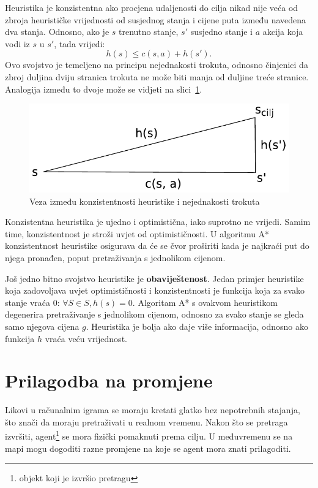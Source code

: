 \documentclass[times, utf8, zavrsni, numeric]{fer}
\begin{document}
\par Heuristika je konzistentna ako procjena udaljenosti do cilja nikad nije veća od zbroja heurističke vrijednosti od susjednog stanja i cijene puta između navedena dva stanja.
Odnosno, ako je \(s\) trenutno stanje, \(s'\) susjedno stanje i \(a\) akcija koja vodi iz \(s\) u \(s'\), tada vrijedi:
\begin{equation}
h(s) \leq c(s, a) + h(s').
\end{equation} 
Ovo svojstvo je temeljeno na principu nejednakosti trokuta, odnosno činjenici da zbroj duljina dviju stranica trokuta ne može biti manja od duljine treće stranice.
Analogija između to dvoje može se vidjeti na slici~\ref{fig:triangleInequality}.

\begin{figure}[h]
	\centering
	\includegraphics[width=0.5\linewidth]{images/triangleInequality.pdf}
	\caption{Veza između konzistentnosti heuristike i nejednakosti trokuta}
	\label{fig:triangleInequality}
\end{figure} 

\par Konzistentna heuristika je ujedno i optimistična, iako suprotno ne vrijedi. 
Samim time, konzistentnost je stroži uvjet od optimističnosti. 
U algoritmu A* konzistentnost heuristike osigurava da će se čvor proširiti kada je najkraći put do njega pronađen, poput pretraživanja s jednolikom cijenom.

\par Još jedno bitno svojstvo heuristike je \textbf{obaviještenost}. 
Jedan primjer heuristike koja zadovoljava uvjet optimističnosti i konzistentnosti je funkcija koja za svako stanje vraća 0: \(\forall S \in S, h(s) = 0\). 
Algoritam A* s ovakvom heuristikom degenerira pretraživanje s jednolikom cijenom, odnosno za svako stanje se gleda samo njegova cijena \(g\). 
Heuristika je bolja ako daje više informacija, odnosno ako funkcija \(h\) vraća veću vrijednost.

\section{Prilagodba na promjene}\label{sec:adaptation}

\par Likovi u računalnim igrama se moraju kretati glatko bez nepotrebnih stajanja, što znači da moraju pretraživati u realnom vremenu.
Nakon što se pretraga izvršiti, agent\footnote{objekt koji je izvršio pretragu} se mora fizički pomaknuti prema cilju.
U međuvremenu se na mapi mogu dogoditi razne promjene na koje se agent mora znati prilagoditi.
\end{document}
